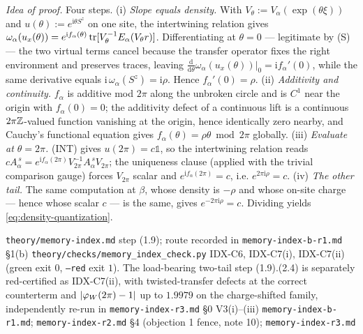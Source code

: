 \emph{Idea of proof.} Four steps. (i) \emph{Slope equals density.} With
$V_\theta:=V_\alpha(\exp(\theta\xi))$ and $u(\theta):=e^{\mathrm{i}\theta S^z}$
on one site, the intertwining relation gives
$\omega_\alpha(u_x(\theta))
 =e^{\mathrm{i}f_\alpha(\theta)}\operatorname{tr}[V_\theta^{-1}E_\alpha(V_\theta r)]$.
Differentiating at $\theta=0$ --- legitimate by (S) --- the two virtual terms
cancel because the transfer operator fixes the right environment and preserves
traces, leaving
$\tfrac{\mathrm{d}}{\mathrm{d}\theta}\omega_\alpha(u_x(\theta))|_0
 =\mathrm{i}f_\alpha'(0)$, while the same derivative equals
$\mathrm{i}\,\omega_\alpha(S^z)=\mathrm{i}\rho$. Hence $f_\alpha'(0)=\rho$.
(ii) \emph{Additivity and continuity.} $f_\alpha$ is additive mod $2\pi$ along
the unbroken circle and is $C^1$ near the origin with $f_\alpha(0)=0$; the
additivity defect of a continuous lift is a continuous $2\pi\mathbb{Z}$-valued
function vanishing at the origin, hence identically zero nearby, and Cauchy's
functional equation gives $f_\alpha(\theta)=\rho\theta \bmod 2\pi$ globally.
(iii) \emph{Evaluate at $\theta=2\pi$.} (INT) gives $u(2\pi)=c\mathbb{1}$, so
the intertwining relation reads
$cA_\alpha^{\,s}=e^{\mathrm{i}f_\alpha(2\pi)}V_{2\pi}^{-1}A_\alpha^{\,s}V_{2\pi}$;
the uniqueness clause (applied with the trivial comparison gauge) forces
$V_{2\pi}$ scalar and $e^{\mathrm{i}f_\alpha(2\pi)}=c$, i.e.
$e^{2\pi\mathrm{i}\rho}=c$. (iv) \emph{The other tail.} The same computation
at $\beta$, whose density is $-\rho$ and whose on-site charge --- hence
whose scalar $c$ --- is the same, gives $e^{-2\pi\mathrm{i}\rho}=c$. Dividing
yields \eqref{eq:density-quantization}.

{\texttt{theory/memory-index.md} step (1.9); route recorded in
 \texttt{memory-index-b-r1.md} \S1(b)}
{\texttt{theory/checks/memory\_index\_check.py} IDX-C6, IDX-C7(i),
 IDX-C7(ii) (green exit $0$, \texttt{--red} exit $1$). The load-bearing
 two-tail step (1.9).(2.4) is separately red-certified as IDX-C7(ii), with
 twisted-transfer defects at the correct counterterm and
 $\lvert \varphi_W(2\pi)-1\rvert$ up to $1.9979$ on the charge-shifted family,
 independently re-run in \texttt{memory-index-r3.md} \S0 V3(i)--(iii)}
{\texttt{memory-index-b-r1.md}; \texttt{memory-index-r2.md} \S4 (objection 1
 fence, note 10); \texttt{memory-index-r3.md}}


